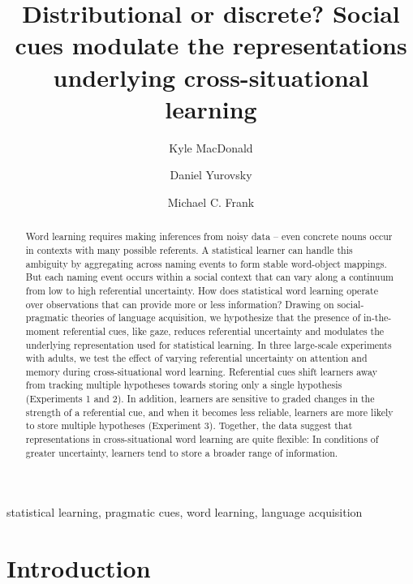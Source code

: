 \documentclass[authoryear, review]{elsarticle}
\date{}
\begin{document}
\begin{frontmatter}

\title{Distributional or discrete? Social cues modulate the representations
underlying cross-situational learning}

\author[km]{Kyle MacDonald}
\author[dy]{Daniel Yurovsky}
\author[mcf]{Michael C. Frank}
\address{Department of Psychology, Stanford University, United States}


\begin{abstract}
Word learning requires making inferences from noisy data -- even
concrete nouns occur in contexts with many possible referents. A
statistical learner can handle this ambiguity by aggregating across
naming events to form stable word-object mappings. But each naming event
occurs within a social context that can vary along a continuum from low
to high referential uncertainty. How does statistical word learning
operate over observations that can provide more or less information?
Drawing on social-pragmatic theories of language acquisition, we
hypothesize that the presence of in-the-moment referential cues, like
gaze, reduces referential uncertainty and modulates the underlying
representation used for statistical learning. In three large-scale
experiments with adults, we test the effect of varying referential
uncertainty on attention and memory during cross-situational word
learning. Referential cues shift learners away from tracking multiple
hypotheses towards storing only a single hypothesis (Experiments 1 and
2). In addition, learners are sensitive to graded changes in the
strength of a referential cue, and when it becomes less reliable,
learners are more likely to store multiple hypotheses (Experiment 3).
Together, the data suggest that representations in cross-situational
word learning are quite flexible: In conditions of greater uncertainty,
learners tend to store a broader range of information.
\end{abstract}

\begin{keyword}
statistical learning, pragmatic cues, word learning, language
acquisition
\end{keyword}

\end{frontmatter}

\section{Introduction}\label{introduction}
\end{document}
